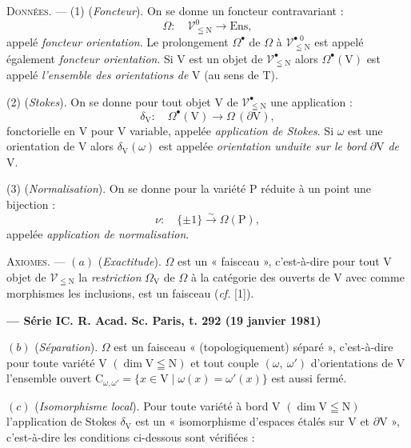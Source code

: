 \textsc{Données}. --- (1) (\textit{Foncteur}). On se donne un foncteur contravariant :
\[
\Omega:\quad\mathscr{V}^{0}_{\leqq\mathrm{N}}\to\mathrm{Ens},
\]
appelé \textit{foncteur orientation}. Le prolongement $\Omega^{\bullet}$ de $\Omega$ à $\mathscr{V}^{\bullet\;0}_{\leqq\mathrm{N}}$ est appelé également \textit{foncteur orientation}. Si $\mathrm{V}$ est un objet de $\mathscr{V}^{\bullet}_{\leqq\mathrm{N}}$ alors $\Omega^{\bullet}(\mathrm{V})$ est appelé \textit{l'ensemble des orientations de} $\mathrm{V}$ (au sens de $\mathrm{T}$).

(2) (\textit{Stokes}). On se donne pour tout objet $\mathrm{V}$ de $\mathscr{V}^{\bullet}_{\leqq\mathrm{N}}$ une application :
\[
\delta_{\mathrm{V}}:\quad\Omega^{\bullet}(\mathrm{V})\to\Omega\,(\partial\mathrm{V}),
\]
fonctorielle en $\mathrm{V}$ pour $\mathrm{V}$ variable, appelée \textit{application de Stokes}. Si $\omega$ est une orientation de $\mathrm{V}$ alors $\delta_{\mathrm{V}}(\omega)$ est appelée \textit{orientation unduite sur le bord} $\partial\mathrm{V}$ \textit{de} $\mathrm{V}$.

(3) (\textit{Normalisation}). On se donne pour la variété $\mathrm{P}$ réduite à un point une bijection :
\[
\nu:\quad\{\pm1\}\overset{\sim}{\to}\Omega(\mathrm{P}),
\]
appelée \textit{application de normalisation}.

\textsc{Axiomes}. --- $(a)$ (\textit{Exactitude}). $\Omega$ est un « faisceau », c'est-à-dire pour tout $\mathrm{V}$ objet de $\mathscr{V}_{\leqq\mathrm{N}}$ la \textit{restriction} $\Omega_{\mathrm{V}}$ de $\Omega$ à la catégorie des ouverts de $\mathrm{V}$ avec comme morphismes les inclusions, est un faisceau (\textit{cf.} [1]).

\textbf{--- Série I\hfill C. R. Acad. Sc. Paris, t. 292 (19 janvier 1981)}

$(b)$ (\textit{Séparation}). $\Omega$ est un faisceau « (topologiquement) séparé », c'est-à-dire pour toute variété $\mathrm{V}$ $(\dim\mathrm{V}\leqq\mathrm{N})$ et tout couple $(\omega,\ \omega')$ d'orientations de $\mathrm{V}$ l'ensemble ouvert $\mathrm{C}_{\omega,\omega'}=\{x\in\mathrm{V}\mid\omega(x)=\omega'(x)\}$ est aussi fermé.

$(c)$ (\textit{Isomorphisme local}). Pour toute variété à bord $\mathrm{V}$ $(\dim\mathrm{V}\leqq\mathrm{N})$ l'application de Stokes $\delta_{\mathrm{V}}$ est un « isomorphisme d'espaces étalés sur $\mathrm{V}$ et $\partial\mathrm{V}$ », c'est-à-dire les conditions ci-dessous sont vérifiées :

